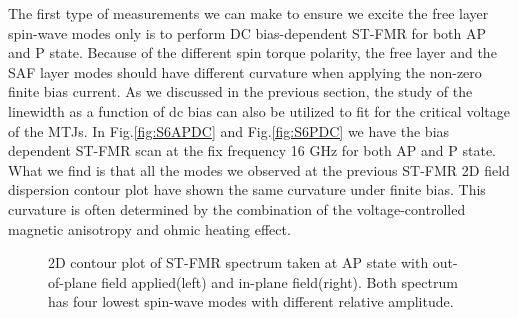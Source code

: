 The first type of measurements we can make to ensure we excite the free layer spin-wave modes only is to perform DC bias-dependent ST-FMR for both AP and P state. Because of the different spin torque polarity, the free layer and the SAF layer modes should have different curvature when applying the non-zero finite bias current. As we discussed in the previous section, the study of the linewidth as a function of dc bias can also be utilized to fit for the critical voltage of the MTJs. In Fig.\ref{fig:S6APDC} and Fig.\ref{fig:S6PDC} we have the bias dependent ST-FMR scan at the fix frequency 16 GHz for both AP and P state. What we find is that all the modes we observed at the previous ST-FMR 2D field dispersion contour plot have shown the same curvature under finite bias. This curvature is often determined by the combination of the voltage-controlled magnetic anisotropy and ohmic heating effect.


\begin{figure}[!ht]
\centering
{}
\caption{2D contour plot of ST-FMR spectrum taken at AP state with out-of-plane field applied(left) and in-plane field(right). Both spectrum has four lowest spin-wave modes with different relative amplitude.}
\end{figure}


